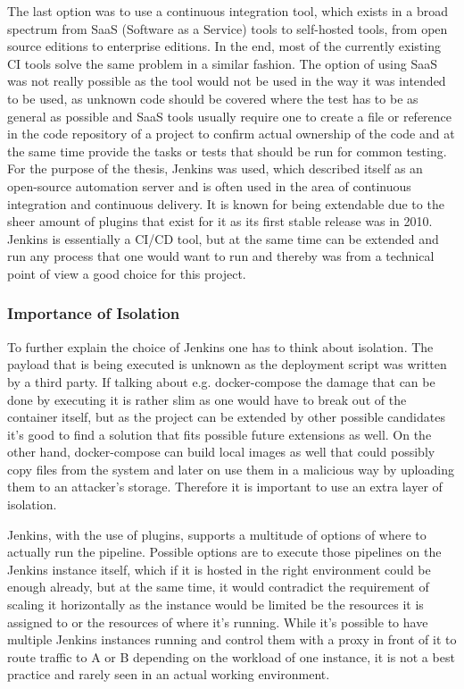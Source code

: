 The last option was to use a continuous integration tool, which exists in a broad spectrum from SaaS (Software as a Service) tools to self-hosted tools, from open source editions to enterprise editions. In the end, most of the currently existing CI tools solve the same problem in a similar fashion. The option of using SaaS was not really possible as the tool would not be used in the way it was intended to be used, as unknown code should be covered where the test has to be as general as possible and SaaS tools usually require one to create a file or reference in the code repository of a project to confirm actual ownership of the code and at the same time provide the tasks or tests that should be run for common testing.
For the purpose of the thesis, Jenkins was used, which described itself as an open-source automation server and is often used in the area of continuous integration and continuous delivery. It is known for being extendable due to the sheer amount of plugins that exist for it as its first stable release was in 2010. Jenkins is essentially a CI/CD tool, but at the same time can be extended and run any process that one would want to run and thereby was from a technical point of view a good choice for this project.

\subsubsection{Importance of Isolation}
To further explain the choice of Jenkins one has to think about isolation. The payload that is being executed is unknown as the deployment script was written by a third party. If talking about e.g. docker-compose the damage that can be done by executing it is rather slim as one would have to break out of the container itself, but as the project can be extended by other possible candidates it's good to find a solution that fits possible future extensions as well. On the other hand, docker-compose can build local images as well that could possibly copy files from the system and later on use them in a malicious way by uploading them to an attacker's storage. Therefore it is important to use an extra layer of isolation.

Jenkins, with the use of plugins, supports a multitude of options of where to actually run the pipeline.
Possible options are to execute those pipelines on the Jenkins instance itself, which if it is hosted in the right environment could be enough already, but at the same time, it would contradict the requirement of scaling it horizontally as the instance would be limited be the resources it is assigned to or the resources of where it's running. While it's possible to have multiple Jenkins instances running and control them with a proxy in front of it to route traffic to A or B depending on the workload of one instance, it is not a best practice and rarely seen in an actual working environment.


